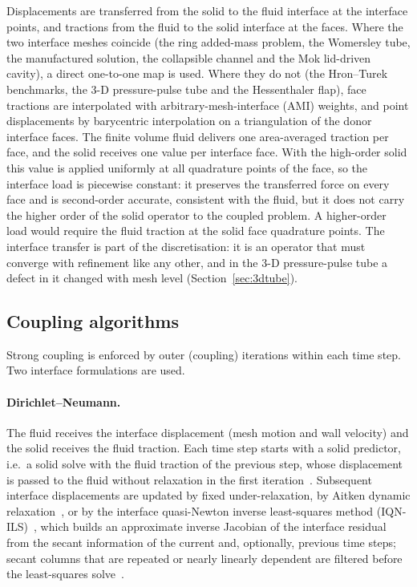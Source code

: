 Displacements are transferred from the solid to the fluid interface at the interface points, and tractions from the fluid to the solid interface at the faces.
Where the two interface meshes coincide (the ring added-mass problem, the Womersley tube, the manufactured solution, the collapsible channel and the Mok lid-driven cavity), a direct one-to-one map is used.
Where they do not (the Hron--Turek benchmarks, the 3-D pressure-pulse tube and the Hessenthaler flap), face tractions are interpolated with arbitrary-mesh-interface (AMI) weights, and point displacements by barycentric interpolation on a triangulation of the donor interface faces.
The finite volume fluid delivers one area-averaged traction per face, and the solid receives one value per interface face.
With the high-order solid this value is applied uniformly at all quadrature points of the face, so the interface load is piecewise constant: it preserves the transferred force on every face and is second-order accurate, consistent with the fluid, but it does not carry the higher order of the solid operator to the coupled problem.
A higher-order load would require the fluid traction at the solid face quadrature points.
The interface transfer is part of the discretisation: it is an operator that must converge with refinement like any other, and in the 3-D pressure-pulse tube a defect in it changed with mesh level (Section~\ref{sec:3dtube}).

\subsection{Coupling algorithms}\label{sec:coupling_algorithms}

Strong coupling is enforced by outer (coupling) iterations within each time step.
Two interface formulations are used.

\paragraph{Dirichlet--Neumann.}
The fluid receives the interface displacement (mesh motion and wall velocity) and the solid receives the fluid traction.
Each time step starts with a solid predictor, i.e.\ a solid solve with the fluid traction of the previous step, whose displacement is passed to the fluid without relaxation in the first iteration~\citep{Tukovic2018}.
Subsequent interface displacements are updated by fixed under-relaxation, by Aitken dynamic relaxation~\citep{kuttler2008fixed}, or by the interface quasi-Newton inverse least-squares method (IQN-ILS)~\citep{Degroote2009, Degroote2013}, which builds an approximate inverse Jacobian of the interface residual from the secant information of the current and, optionally, previous time steps; secant columns that are repeated or nearly linearly dependent are filtered before the least-squares solve~\citep{Haelterman2016}.

